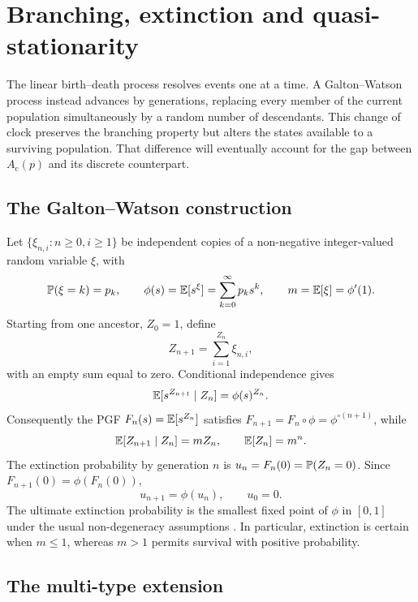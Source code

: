 \section{Branching, extinction and quasi-stationarity}
\label{sec:gw}

The linear birth--death process resolves events one at a time.  A
Galton--Watson process instead advances by generations, replacing every member of
the current population simultaneously by a random number of descendants.  This
change of clock preserves the branching property but alters the states available
to a surviving population.  That difference will eventually account for the gap
between \(A_{\mathrm c}(p)\) and its discrete counterpart.

\subsection{The Galton--Watson construction}

Let \(\{\xi_{n,i}:n\geq0,i\geq1\}\) be independent copies of a non-negative
integer-valued random variable \(\xi\), with
\[
  \mathbb{P}(\xi=k)=p_k,
  \qquad
  \phi(s)=\mathbb{E}[s^\xi]=\sum_{k=0}^{\infty}p_ks^k,
  \qquad
  m=\mathbb{E}[\xi]=\phi'(1).
\]
Starting from one ancestor, \(Z_0=1\), define
\begin{equation}
  Z_{n+1}=\sum_{i=1}^{Z_n}\xi_{n,i},
  \label{eq:gw-definition}
\end{equation}
with an empty sum equal to zero.  Conditional independence gives
\begin{equation}
  \mathbb{E}[s^{Z_{n+1}}\mid Z_n]=\phi(s)^{Z_n}.
  \label{eq:gw-conditional-pgf}
\end{equation}
Consequently the PGF \(F_n(s)=\mathbb{E}[s^{Z_n}]\) satisfies
\(F_{n+1}=F_n\circ\phi=\phi^{\circ(n+1)}\), while
\begin{equation}
  \mathbb{E}[Z_{n+1}\mid Z_n]=mZ_n,
  \qquad
  \mathbb{E}[Z_n]=m^n.
  \label{eq:gw-mean}
\end{equation}
The extinction probability by generation \(n\) is
\(u_n=F_n(0)=\mathbb{P}(Z_n=0)\).  Since \(F_{n+1}(0)=\phi(F_n(0))\),
\begin{equation}
  u_{n+1}=\phi(u_n),
  \qquad u_0=0.
  \label{iterPGF}
\end{equation}
The ultimate extinction probability is the smallest fixed point of \(\phi\) in
\([0,1]\) under the usual non-degeneracy assumptions
\cite{Harris1963,Athreya1972}.  In particular, extinction is certain when
\(m\leq1\), whereas \(m>1\) permits survival with positive probability.

\subsection{The multi-type extension}
\label{sec:multitype}

